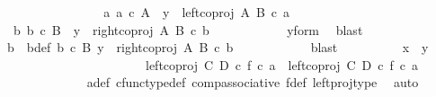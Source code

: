 \begin{isabellebody}
\ \ \ \ \ \ \isamarkupfalse%
\isanewline
\ \ \ \ \ \ \ \ \isamarkupfalse%
\ {\isachardoublequoteopen}{\isasymnexists}a{\isachardot}{\kern0pt}\ a\ {\isasymin}\isactrlsub c\ A\ {\isasymand}\ y\ {\isacharequal}{\kern0pt}\ left{\isacharunderscore}{\kern0pt}coproj\ A\ B\ {\isasymcirc}\isactrlsub c\ a{\isachardoublequoteclose}\isanewline
\ \ \ \ \ \ \ \ \isamarkupfalse%
\ \isamarkupfalse%
\ {\isachardoublequoteopen}{\isasymexists}\ b{\isachardot}{\kern0pt}\ b\ {\isasymin}\isactrlsub c\ B\ {\isasymand}\ y\ {\isacharequal}{\kern0pt}\ right{\isacharunderscore}{\kern0pt}coproj\ A\ B\ {\isasymcirc}\isactrlsub c\ b{\isachardoublequoteclose}\isanewline
\ \ \ \ \ \ \ \ \ \ \isamarkupfalse%
\ y{\isacharunderscore}{\kern0pt}form\ \isamarkupfalse%
\ blast\isanewline
\ \ \ \ \ \ \ \ \isamarkupfalse%
\ \isamarkupfalse%
\ b{\isacharprime}{\kern0pt}\ \ b{\isacharprime}{\kern0pt}{\isacharunderscore}{\kern0pt}def{\isacharcolon}{\kern0pt}\ {\isachardoublequoteopen}b{\isacharprime}{\kern0pt}\ {\isasymin}\isactrlsub c\ B{\isachardoublequoteclose}\ {\isachardoublequoteopen}y\ {\isacharequal}{\kern0pt}\ right{\isacharunderscore}{\kern0pt}coproj\ A\ B\ {\isasymcirc}\isactrlsub c\ b{\isacharprime}{\kern0pt}{\isachardoublequoteclose}\isanewline
\ \ \ \ \ \ \ \ \ \ \isamarkupfalse%
\ blast\isanewline
\ \ \ \ \ \ \ \ \isamarkupfalse%
\ {\isachardoublequoteopen}x\ {\isacharequal}{\kern0pt}\ y{\isachardoublequoteclose}\isanewline
\ \ \ \ \ \ \ \ \isamarkupfalse%
\ {\isacharminus}{\kern0pt}\ \isanewline
\ \ \ \ \ \ \ \ \ \ \isamarkupfalse%
\ {\isachardoublequoteopen}left{\isacharunderscore}{\kern0pt}coproj\ C\ D\ {\isasymcirc}\isactrlsub c\ {\isacharparenleft}{\kern0pt}f\ {\isasymcirc}\isactrlsub c\ a{\isacharparenright}{\kern0pt}\ {\isacharequal}{\kern0pt}\ {\isacharparenleft}{\kern0pt}left{\isacharunderscore}{\kern0pt}coproj\ C\ D\ {\isasymcirc}\isactrlsub c\ f{\isacharparenright}{\kern0pt}\ {\isasymcirc}\isactrlsub c\ a{\isachardoublequoteclose}\isanewline
\ \ \ \ \ \ \ \ \ \ \ \ \isamarkupfalse%
\ a{\isacharunderscore}{\kern0pt}def\ cfunc{\isacharunderscore}{\kern0pt}type{\isacharunderscore}{\kern0pt}def\ comp{\isacharunderscore}{\kern0pt}associative\ f{\isacharunderscore}{\kern0pt}def\ left{\isacharunderscore}{\kern0pt}proj{\isacharunderscore}{\kern0pt}type\ \isamarkupfalse%
\ auto\isanewline
\ \ \ \ \ \ \ \ \ \ \isamarkupfalse%

\end{isabellebody}
